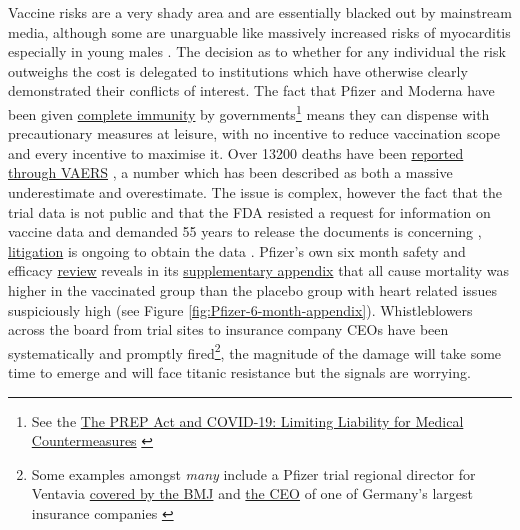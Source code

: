 \documentclass[11pt,a4paper,notitlepage]{report}
\begin{document}
Vaccine risks are a very shady area and are essentially blacked out by mainstream media, although some are unarguable like massively increased risks of myocarditis especially in young males \cite{10.1001/jama.2021.24110}. The decision as to whether for any individual the risk outweighs the cost is delegated to institutions which have otherwise clearly demonstrated their conflicts of interest. The fact that Pfizer and Moderna have been given \href{https://www.cnbc.com/2020/12/16/covid-vaccine-side-effects-compensation-lawsuit.html}{complete immunity} \cite{cnbc17122020} by governments\footnote{See the \href{https://crsreports.congress.gov/product/pdf/LSB/LSB10443}{The PREP Act and COVID-19: Limiting Liability for Medical Countermeasures} \cite{cnsreports13012022}} means they can dispense with precautionary measures at leisure, with no incentive to reduce vaccination scope and every incentive to maximise it. Over 13200 deaths have been \href{https://www.cdc.gov/coronavirus/2019-ncov/vaccines/safety/adverse-events.html}{reported through VAERS} \cite{cdc14032022}, a number which has been described as both a massive underestimate and overestimate. The issue is complex, however the fact that the trial data is not public and that the FDA resisted a request for information on vaccine data and demanded 55 years to release the documents is concerning \cite{mailonline19112021}, \href{https://phmpt.org/}{litigation} is ongoing to obtain the data \cite{phmpt}. Pfizer's own six month safety and efficacy \href{https://www.nejm.org/doi/full/10.1056/NEJMoa2110345}{review} \cite{doi:10.1056/NEJMoa2110345} reveals in its \href{https://www.nejm.org/doi/suppl/10.1056/NEJMoa2110345/suppl_file/nejmoa2110345_appendix.pdf}{supplementary appendix} \cite{doi:10.1056/NEJMoa2110345-appendix} that all cause mortality was higher in the vaccinated group than the placebo group with heart related issues suspiciously high (see Figure \ref{fig:Pfizer-6-month-appendix}). Whistleblowers across the board from trial sites to insurance company CEOs have been systematically and promptly fired\footnote{Some examples amongst \textit{many} include a Pfizer trial regional director for Ventavia \href{https://www.bmj.com/content/375/bmj.n2635}{covered by the BMJ} \cite{bmj02112021} and \href{https://childrenshealthdefense.org/defender/german-insurance-fires-andreas-schofbeck-covid-vaccine-injuries-data/}{the CEO} of one of Germany's largest insurance companies \cite{defender140322}}, the magnitude of the damage will take some time to emerge and will face titanic resistance but the signals are worrying.
\end{document}
